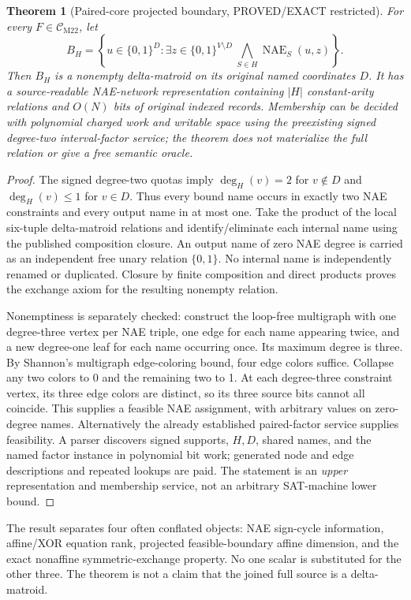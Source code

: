 \documentclass[11pt]{article}
\newtheorem{theorem}{Theorem}
\newcommand{\CM}{\mathcal C_{\mathrm{M22}}}
\newcommand{\NAE}{\operatorname{NAE}}
\begin{document}
\begin{theorem}[Paired-core projected boundary, PROVED/EXACT restricted]
For every $F\in\CM$, let
\[
B_H=\left\{u\in\{0,1\}^{D}:
\exists z\in\{0,1\}^{V\setminus D}\ 
\bigwedge_{S\in H}\NAE_S(u,z)\right\}.
\]
Then $B_H$ is a nonempty delta-matroid on its \emph{original named} coordinates $D$. It has a source-readable NAE-network representation containing $|H|$ constant-arity relations and $O(N)$ bits of original indexed records. Membership can be decided with polynomial charged work and writable space using the \emph{preexisting signed degree-two interval-factor service}; the theorem does not materialize the full relation or give a free semantic oracle.
\end{theorem}
\begin{proof}
The signed degree-two quotas imply $\deg_H(v)=2$ for $v\notin D$ and $\deg_H(v)\le1$ for $v\in D$. Thus every bound name occurs in exactly two NAE constraints and every output name in at most one. Take the product of the local six-tuple delta-matroid relations and identify/eliminate each internal name using the published composition closure. An output name of zero NAE degree is carried as an independent free unary relation $\{0,1\}$. No internal name is independently renamed or duplicated. Closure by finite composition and direct products proves the exchange axiom for the resulting nonempty relation.

Nonemptiness is separately checked: construct the loop-free multigraph with one degree-three vertex per NAE triple, one edge for each name appearing twice, and a new degree-one leaf for each name occurring once. Its maximum degree is three. By Shannon's multigraph edge-coloring bound, four edge colors suffice. Collapse any two colors to 0 and the remaining two to 1. At each degree-three constraint vertex, its three edge colors are distinct, so its three source bits cannot all coincide. This supplies a feasible NAE assignment, with arbitrary values on zero-degree names. Alternatively the already established paired-factor service supplies feasibility. A parser discovers signed supports, $H,D$, shared names, and the named factor instance in polynomial bit work; generated node and edge descriptions and repeated lookups are paid. The statement is an \emph{upper} representation and membership service, not an arbitrary SAT-machine lower bound.
\end{proof}

The result separates four often conflated objects: NAE sign-cycle information, affine/XOR equation rank, projected feasible-boundary affine dimension, and the exact nonaffine symmetric-exchange property. No one scalar is substituted for the other three. The theorem is not a claim that the joined full source is a delta-matroid.
\end{document}
